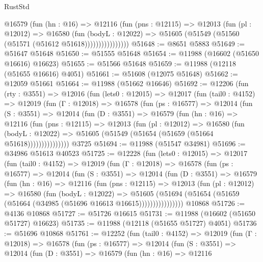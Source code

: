 \begin{lexlean}{RustStd}
\begin{coremodule}
                  @16579
                    (fun (hn : @16) =>
                    @12116
                      (fun (pns : @12115) =>
                      @12013
                        (fun (pl : @12012) =>
                        @16580
                          (fun (bodyL : @12022) =>
                          @51605 (@51549 (@51560 (@51571 (@51612 @51618))))))))))))))))
@51648 := @8651 @5883
@51649 := @51647 @51648
@51650 := @51555 @51648
@51654 := @11988 (@16602 (@51650 @16616) @16623)
@51655 := @51566 @51648
@51659 := @11988 (@12118 (@51655 @16616) @4051)
@51661 := @51608 (@12075 @51648)
@51662 := @12059 @51661
@51664 := @11988 (@51662 @16646)
@51692 := @12206
    (fun (rty : @3551) =>
    @12016
      (fun (lets0 : @12015) =>
      @12017
        (fun (tail0 : @4152) =>
        @12019
          (fun (Γ : @12018) =>
          @16578
            (fun (ps : @16577) =>
            @12014
              (fun (S : @3551) =>
              @12014
                (fun (D : @3551) =>
                @16579
                  (fun (hn : @16) =>
                  @12116
                    (fun (pns : @12115) =>
                    @12013
                      (fun (pl : @12012) =>
                      @16580
                        (fun (bodyL : @12022) =>
                        @51605 (@51549 (@51654 (@51659 (@51664 @51618)))))))))))))))
    @3725
@51694 := @11988 (@51547 @34981)
@51696 := @34986 @51613 @40523
@51725 := @12228
    (fun (lets0 : @12015) =>
    @12017
      (fun (tail0 : @4152) =>
      @12019
        (fun (Γ : @12018) =>
        @16578
          (fun (ps : @16577) =>
          @12014
            (fun (S : @3551) =>
            @12014
              (fun (D : @3551) =>
              @16579
                (fun (hn : @16) =>
                @12116
                  (fun (pns : @12115) =>
                  @12013
                    (fun (pl : @12012) =>
                    @16580
                      (fun (bodyL : @12022) =>
                      @51605
                        (@51694
                          (@51654 (@51659 (@51664 (@34985 (@51696 @16613 @16615))))))))))))))))
    @10868
@51726 := @4136 @10868
@51727 := @51726 @16615
@51731 := @11988 (@16602 (@51650 @51727) @16623)
@51735 := @11988 (@12118 (@51655 @51727) @4051)
@51736 := @51696 @10868
@51761 := @12252
    (fun (tail0 : @4152) =>
    @12019
      (fun (Γ : @12018) =>
      @16578
        (fun (ps : @16577) =>
        @12014
          (fun (S : @3551) =>
          @12014
            (fun (D : @3551) =>
            @16579
              (fun (hn : @16) =>
              @12116

\end{coremodule}
\end{lexlean}

